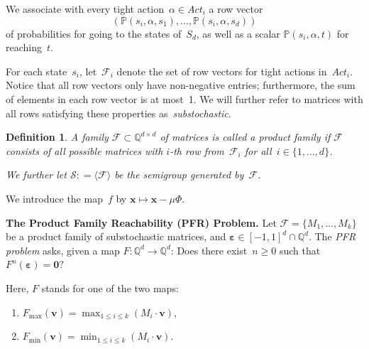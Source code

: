 \documentclass[preprint,12pt]{elsarticle}
\theoremstyle{plain}
\newtheorem{definition}[theorem]{Definition}
\theoremstyle{definition}
\theoremstyle{remark}
\theoremstyle{claimstyle}
\newcommand{\prob}{\mathbb{P}}
\newcommand{\QQ}{\mathbb{Q}}
\newcommand{\eps}{\bm{\varepsilon}}
\begin{document}
We associate with every tight action~$\alpha \in Act_i$ a row vector
\[\left( \prob(s_i, \alpha, s_1), \dots, \prob(s_i, \alpha, s_d) \right)\]
of probabilities for going to the states of~$S_d$,
as well as a scalar $\prob(s_i, \alpha, t)$ for reaching~$t$.

For each state~$s_i$, let~$\mathcal{F}_i$ denote the set of row vectors for tight actions in~$Act_i$.
Notice that all row vectors only have non-negative entries; furthermore, the sum of elements in each row vector is at most~1. %
We will further refer to matrices with all rows satisfying these properties as~\emph{substochastic}.

\begin{definition}
A family $\mathcal{F} \subset \QQ^{d \times d}$ of matrices is called a \emph{product family}
if $\mathcal{F}$ consists of all possible matrices with $i$-th row from~$\mathcal{F}_i$ for all~$i \in \{1, \dots, d\}$.

We further let $\mathcal{S}: = \langle \mathcal{F} \rangle$ 
be the semigroup generated by~$\mathcal{F}$.
\end{definition}
We introduce the map~$f$ by $\bm{x} \mapsto \bm{x} - \mu\Phi$.
\begin{mdframed}
\textbf{The Product Family Reachability (PFR) Problem.}
Let $\mathcal{F} = \{M_1, \dots, M_k\}$ be a product family of substochastic matrices, and $\eps \in [-1,1]^d\cap \QQ^d$.
The \emph{PFR problem} asks, given a map $F: \QQ^d \rightarrow \QQ^d$: Does there exist~$n \geq 0$ such that $F^n(\eps) = \bm{0}$? 

Here, $F$ stands for one of the two maps:
\begin{enumerate}
	\item $F_{\max}(\bm{v}) = \max_{1\leq i \leq k} \left(M_i \cdot\bm{v}\right)$,
	\item $F_{\min}(\bm{v}) = \min_{1\leq i \leq k} \left(M_i \cdot\bm{v}\right)$.
\end{enumerate}
\end{mdframed}
\end{document}
